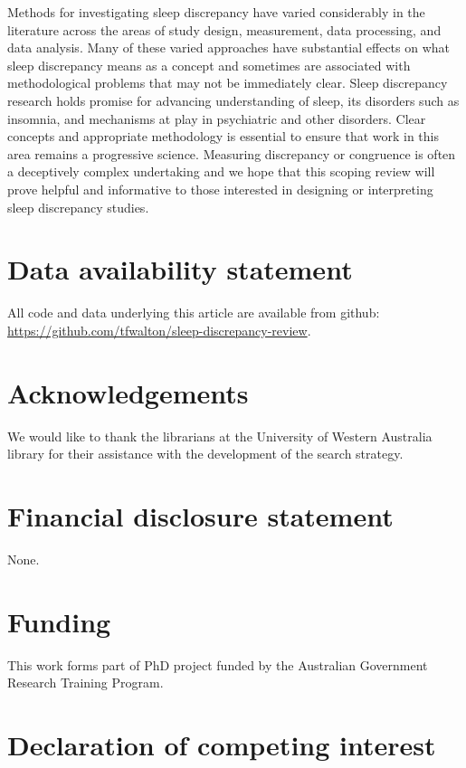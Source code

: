 \documentclass[
]{article}
\begin{document}
Methods for investigating sleep discrepancy have varied considerably in the literature across the areas of study design, measurement, data processing, and data analysis. Many of these varied approaches have substantial effects on what sleep discrepancy means as a concept and sometimes are associated with methodological problems that may not be immediately clear. Sleep discrepancy research holds promise for advancing understanding of sleep, its disorders such as insomnia, and mechanisms at play in psychiatric and other disorders. Clear concepts and appropriate methodology is essential to ensure that work in this area remains a progressive science. Measuring discrepancy or congruence is often a deceptively complex undertaking and we hope that this scoping review will prove helpful and informative to those interested in designing or interpreting sleep discrepancy studies.

\section{Data availability statement}\label{data-availability-statement}

All code and data underlying this article are available from github: \url{https://github.com/tfwalton/sleep-discrepancy-review}.

\section{Acknowledgements}\label{acknowledgements}

We would like to thank the librarians at the University of Western Australia library for their assistance with the development of the search strategy.

\section{Financial disclosure statement}\label{financial-disclosure-statement}

None.

\section{Funding}\label{item22}

This work forms part of PhD project funded by the Australian Government Research Training Program.

\section{Declaration of competing interest}\label{declaration-of-competing-interest}
\end{document}

